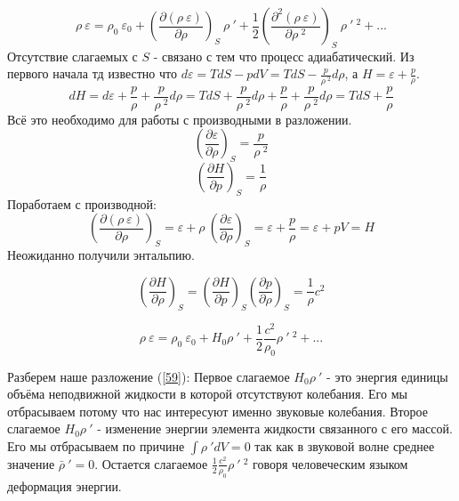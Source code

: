\documentclass[14pt,a4paper,oneside]{extarticle}	%
\newcommand{\bracket}[1] {\left( #1 \right) } %
\newcommand{\dd}[1] {\partial #1 }
\newcommand{\dif}[2] {\bracket{ \frac{\partial #1}{\partial #2} }}
\begin{document}
\begin{equation}\label{58}
 \rho\:\varepsilon =  \rho_{0}\:\varepsilon_{0} + \bracket{\frac{\dd{ (\rho\:\varepsilon) }}{\dd{\rho}}}_{S} \: \rho\:' + \frac{1}{2}\bracket{\frac{\dd{^{2} (\rho\:\varepsilon) }}{\dd{\rho\:^{2}}}}_{S} \: \rho\:'\:^{2} + ...
\end{equation}
Отсутствие слагаемых с $ S $ - связано с тем что процесс адиабатический.
Из первого начала тд известно что $ d\varepsilon = TdS - pdV = TdS - \frac{p}{\rho\:^{2}}d\rho$, а $ H = \varepsilon + \frac{p}{\rho}$.
\begin{equation*}
 dH = d\varepsilon + \frac{p}{\rho} + \frac{p}{\rho\:^{2}}d\rho = TdS + \frac{p}{\rho\:^{2}}d\rho + \frac{p}{\rho} + \frac{p}{\rho\:^{2}}d\rho =  TdS + \frac{p}{\rho} 
\end{equation*}
Всё это необходимо для работы с производными в разложении.
\begin{equation*}
\bracket{\frac{\dd{\varepsilon}}{\dd{\rho}}}_{S} = \frac{p}{\rho\:^{2}}
\end{equation*}
\begin{equation*}
\bracket{\frac{\dd{H}}{\dd{p}}}_{S} = \frac{1}{\rho}
\end{equation*}
Поработаем с производной:
\begin{equation*}
 \bracket{\frac{\dd{ (\rho\:\varepsilon) }}{\dd{\rho}}}_{S} = \varepsilon + \rho\:\bracket{\frac{\dd{\varepsilon}}{\dd{\rho}}}_{S} = \varepsilon +  \frac{p}{\rho} = \varepsilon + pV = H
\end{equation*}
Неожиданно получили энтальпию.

\begin{equation*}
\dif{H}{\rho}_{S} = \dif{H}{p}_{S}\dif{p}{\rho}_{S} = \frac{1}{\rho}c^{2}
\end{equation*}

\begin{equation}\label{59}
\rho\:\varepsilon = \rho_{0}\:\varepsilon_{0} + H_{0}\rho\:' + \frac{1}{2}\frac{c^{2}}{\rho_{0}}\rho\:'\:^{2} +...
\end{equation}

Разберем наше разложение (\ref{59}):
Первое слагаемое $ H_{0}\rho\:' $ - это энергия единицы объёма неподвижной жидкости в которой отсутствуют колебания. Его мы отбрасываем потому что нас интересуют именно звуковые колебания.
Второе слагаемое $ H_{0}\rho\:' $  - изменение энергии элемента жидкости связанного с его массой. Его мы отбрасываем по причине $ \int \rho\:' dV = 0 $ так как в звуковой волне среднее значение $ \bar{\rho}\:' = 0 $.
Остается слагаемое $ \frac{1}{2}\frac{c^{2}}{\rho_{0}}\rho\:'\:^{2} $ говоря человеческим языком деформация энергии.
\end{document}
